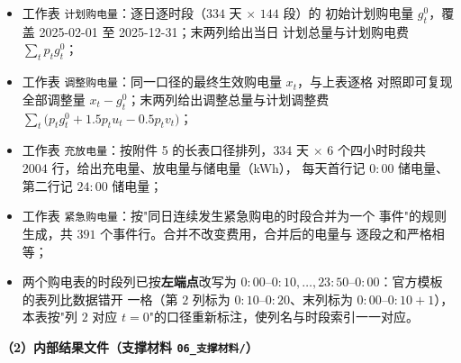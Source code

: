 \documentclass[withoutpreface,bwprint]{cumcmthesis}
\begin{document}
\begin{appendices}
\begin{itemize}
  \item 工作表 \texttt{计划购电量}：逐日逐时段（$334$ 天 $\times$ $144$ 段）的
        初始计划购电量 $g_t^0$，覆盖 2025-02-01 至 2025-12-31；末两列给出当日
        计划总量与计划购电费 $\sum_tp_tg_t^0$；
  \item 工作表 \texttt{调整购电量}：同一口径的最终生效购电量 $x_t$，与上表逐格
        对照即可复现全部调整量 $x_t-g_t^0$；末两列给出调整总量与计划调整费
        $\sum_t\big(p_tg_t^0+1.5p_tu_t-0.5p_tv_t\big)$；
  \item 工作表 \texttt{充放电量}：按附件 5 的长表口径排列，$334$ 天 $\times$
        $6$ 个四小时时段共 $2004$ 行，给出充电量、放电量与储电量（kWh），
        每天首行记 $0{:}00$ 储电量、第二行记 $24{:}00$ 储电量；
  \item 工作表 \texttt{紧急购电量}：按"同日连续发生紧急购电的时段合并为一个
        事件"的规则生成，共 $391$ 个事件行。合并不改变费用，合并后的电量与
        逐段之和严格相等；
  \item 两个购电表的时段列已按\textbf{左端点}改写为
        $0{:}00$--$0{:}10,\dots,23{:}50$--$0{:}00$：官方模板的表列比数据错开
        一格（第 $2$ 列标为 $0{:}10$--$0{:}20$、末列标为 $0{:}00$--$0{:}10{+}1$），
        本表按"列 $2$ 对应 $t=0$"的口径重新标注，使列名与时段索引一一对应。
\end{itemize}

\textbf{（2）内部结果文件（支撑材料 \texttt{06\_支撑材料/}）}


\end{appendices}
\end{document}
